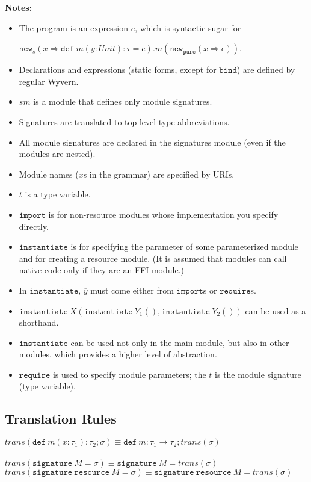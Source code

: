 \documentclass{llncs}
\newcommand{\keywadj}[1]{\mathtt{#1}}
\newcommand{\keyw}[1]{\keywadj{#1}~}
\begin{document}
\noindent\textbf{Notes:}
\begin{itemize}
\item The program is an expression $e$, which is syntactic sugar for

$\keywadj{new}_s(x \Rightarrow \keyw{def} m(y : Unit) : \tau = e).m(\keywadj{new}_{\keywadj{pure}}(x \Rightarrow \epsilon))$.
\item Declarations and expressions (static forms, except for $\keywadj{bind}$) are defined by regular Wyvern.
\item $sm$ is a module that defines only module signatures.
\item Signatures are translated to top-level type abbreviations.
\item All module signatures are declared in the signatures module (even if the modules are nested).
\item Module names ($x$s in the grammar) are specified by URIs.
\item $t$ is a type variable.
\item $\keywadj{import}$ is for non-resource modules whose implementation you specify directly.
\item $\keywadj{instantiate}$ is for specifying the parameter of some parameterized module and for creating a resource module. (It is assumed that modules can call native code only if they are an FFI module.)
\item In $\keywadj{instantiate}$, $\overline{y}$ must come either from $\keywadj{import}$s or $\keywadj{require}$s.
\item $\keyw{instantiate} X(\keyw{instantiate} Y_1(), \keyw{instantiate} Y_2())$ can be used as a shorthand.
\item $\keywadj{instantiate}$ can be used not only in the main module, but also in other modules, which provides a higher level of abstraction.
\item $\keywadj{require}$ is used to specify module parameters; the $t$ is the module signature (type variable).

\end{itemize}


\newpage

\subsection{Translation Rules}

$\textit{trans}(\keyw{def} m(x : \tau_1) : \tau_2; \sigma) \equiv \keyw{def} m : \tau_1 \rightarrow \tau_2; trans(\sigma)$\\
\\
$\textit{trans}(\keyw{signature} M = \sigma) \equiv \keyw{signature} M = trans(\sigma)$ \\
$\textit{trans}(\keyw{signature} \keyw{resource} M = \sigma) \equiv \keyw{signature} \keyw{resource} M = trans(\sigma)$ \\
\end{document}
